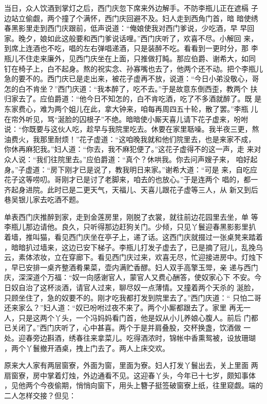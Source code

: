 当日，众人饮酒到掌灯之后，西门庆忽下席来外边解手。不防李瓶儿正在遮槅
子边站立偷觑，两个撞了个满怀，西门庆回避不及。妇人走到西角门首，暗
暗使绣春黑影里走到西门庆跟前，低声说道：“俺娘使我对西门爹说，少吃酒，早
早回家。晚夕，娘如此这般要和西门爹说话哩。”西门庆听了，欢喜不尽。小解回
来，到席上连酒也不吃，唱的左右弹唱递酒，只是装醉不吃。看看到一更时分，那
李瓶儿不住走来廉外，见西门庆坐在上面，只推做打盹。那应伯爵、谢希大，如同
钉在椅子上，白不起身。熬的祝实念、孙寡嘴也去了，他两个还不动。把个李瓶儿
急的要不的。西门庆已是走出来，被花子虚再不放，说道：“今日小弟没敬心，哥
怎的白不肯坐？”西门庆道：“我本醉了，吃不去。”于是故意东倒西歪，教两个
扶归家去了。应伯爵道：“他今日不知怎的，白不肯吃酒，吃了不多酒就醉了。既
是东家费心，难为两个姐儿在此，拿大钟来，咱每再周四五十轮，散了罢。”李瓶
儿在帘外听见，骂“涎脸的囚根子”不绝。暗暗使小厮天喜儿请下花子虚来，吩咐
说：“你既要与这伙人吃，趁早与我院里吃去。休要在家里聒噪。我半夜三更，熬
油费火，我那里耐烦！”花子虚道：“这咱晚我就和他们院里去，也是来家不成，
你休再麻犯我。”妇人道：“你去，我不麻犯便了。”这花子虚得不的这一声，走
来对众人说：“我们往院里去。”应伯爵道：“真个？休哄我。你去问声嫂子来，
咱好起身。”子虚道：“房下刚才已是说了，教我明日来家。”谢希大道：“可是
来，自吃应花子这等唠叨。哥刚才已是讨了老脚来，咱去的也放心。”于是连两个
唱的，都一齐起身进院。此时已是二更天气，天福儿、天喜儿跟花子虚等三人，从
新又到后巷吴银儿家去吃酒不题。

单表西门庆推醉到家，走到金莲房里，刚脱了衣裳，就往前边花园里去坐，单
等李瓶儿那边请他。良久，只听得那边赶狗关门。少倾，只见丫鬟迎春黑影影里扒
着墙，推叫猫，看见西门庆坐在亭子上，递了话。这西门庆就掇过一张桌凳来踏着
，暗暗扒过墙来，这边已安下梯子。李瓶儿打发子虚去了，已是摘了冠儿，乱挽乌
云，素体浓妆，立在穿廊下。看见西门庆过来，欢喜无尽，忙迎接进房中。灯烛下
，早已安排一桌齐整酒肴果菜，壶内满贮香醪。妇人双手高擎玉斝，亲
递与西门庆，深深道个万福：“奴一向感谢官人，蒙官人又费心酬答，使奴家心下
不安。今日奴自治了这杯淡酒，请官人过来，聊尽奴一点薄情。又撞着两个天杀的
涎脸，只顾坐住了，急的奴要不的。刚才吃我都打发到院里去了。”西门庆道：“
只怕二哥还来家么？”妇人道：“奴已吩咐过夜不来了。两个小厮都跟去了。家里
再无一人，只是这两个丫头，一个冯妈妈看门首，他是奴从小儿养娘心腹人。前后
门都已关闭了。”西门庆听了，心中甚喜。两个于是并肩叠股，交杯换盏，饮酒做
一处。迎春旁边斟酒，绣春往来拿菜儿。吃得酒浓时，锦帐中香熏鸳被，设放珊瑚
，两个丫鬟撤开酒桌，拽上门去了。两人上床交欢。

原来大人家有两层窗寮，外面为窗，里面为寮。妇人打发丫鬟出去，关上里面
两扇窗寮，房中掌着灯烛，外边通看不见。这迎春丫头，今年已十七岁，颇知事体
，见他两个今夜偷期，悄悄向窗下，用头上簪子挺签破窗寮上纸，往里窥觑。端的
二人怎样交接？但见：

